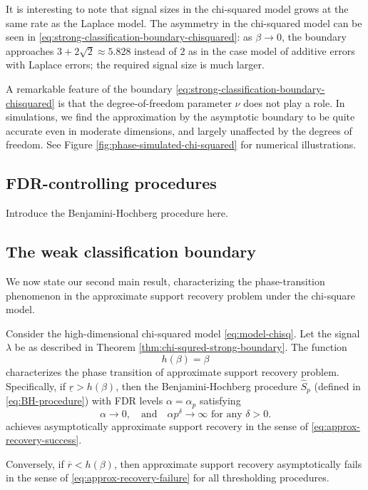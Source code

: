 \begin{remark}
It is interesting to note that signal sizes in the chi-squared model grows at the same rate as the Laplace model.
The asymmetry in the chi-squared model can be seen in \eqref{eq:strong-classification-boundary-chisquared}: as $\beta\to0$, the boundary approaches $3+2\sqrt{2} \approx 5.828$ instead of $2$ as in the case model of additive errors with Laplace errors; the required signal size is much larger.
\end{remark}

\begin{remark}
A remarkable feature of the boundary \eqref{eq:strong-classification-boundary-chisquared} is that the degree-of-freedom parameter $\nu$ does not play a role.
In simulations, we find the approximation by the asymptotic boundary to be quite accurate even in moderate dimensions, and largely unaffected by the degrees of freedom.
See Figure \ref{fig:phase-simulated-chi-squared} for numerical illustrations.
\end{remark}

\subsection{FDR-controlling procedures}
\label{subsec:FDR-controlling-procedures}

Introduce the Benjamini-Hochberg procedure here.

\subsection{The weak classification boundary}
\label{subsec:weak-classification-boundary}

We now state our second main result, characterizing the phase-transition phenomenon in the approximate support recovery problem under the chi-square model.

\begin{theorem} \label{thm:chi-squred-weak-boundary}
Consider the high-dimensional chi-squared model \eqref{eq:model-chisq}.
Let the signal $\lambda$ be as described in Theorem \ref{thm:chi-squred-strong-boundary}.
The function 
\begin{equation} \label{eq:weak-classification-boundary-chisquared}
    h(\beta) = \beta
\end{equation}
characterizes the phase transition of approximate support recovery problem.
Specifically, if $\underline{r} > {h}(\beta)$, then the Benjamini-Hochberg procedure $\widehat{S}_p$ (defined in \eqref{eq:BH-procedure}) with FDR levels $\alpha=\alpha_p$ satisfying
\begin{equation} \label{eq:FDR-rate-to-zero}
    \alpha\to 0,\quad \text{and} \quad \alpha p^\delta\to\infty \text{  for any } \delta>0.
\end{equation}
achieves asymptotically approximate support recovery in the sense of \eqref{eq:approx-recovery-success}. 

Conversely, if $\overline{r} < {h}(\beta)$, then approximate support recovery asymptotically fails in the sense of \eqref{eq:approx-recovery-failure} for all thresholding procedures.
\end{theorem}
